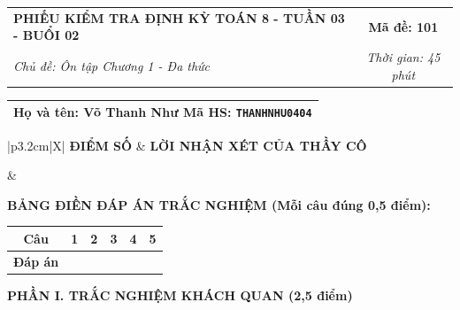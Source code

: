 \documentclass[12pt,a4paper]{article}
\begin{document}
\newpage



\noindent
\begin{tabularx}{\linewidth}{|X|c|}
\hline
\textbf{PHIẾU KIỂM TRA ĐỊNH KỲ TOÁN 8 - TUẦN 03 - BUỔI 02} & \textbf{Mã đề: 101} \\
\textit{Chủ đề: Ôn tập Chương 1 - Đa thức} & \textit{Thời gian: 45 phút} \\
\hline
\end{tabularx}

\vspace{1mm}

\noindent
\begin{tabularx}{\linewidth}{|X|}
\hline
\rule[-2mm]{0pt}{7.5mm}\textbf{Họ và tên:} \textbf{\large Võ Thanh Như} \hfill \textbf{Mã HS:} \texttt{THANHNHU0404} \quad \\
\hline
\end{tabularx}

\vspace{1mm}

\noindent
\begin{tabularx}{\linewidth}{|p{3.2cm}|X|}
\hline
\centering\textbf{ĐIỂM SỐ} & \centering\textbf{LỜI NHẬN XÉT CỦA THẦY CÔ} \tabularnewline
\hline
\rule{0pt}{1.3cm} & \tabularnewline
\hline
\end{tabularx}

\vspace{1.2mm}

\noindent\textbf{BẢNG ĐIỀN ĐÁP ÁN TRẮC NGHIỆM (Mỗi câu đúng 0,5 điểm):}
\vspace{0.8mm}

\noindent
\renewcommand{\arraystretch}{1.35}
\begin{tabularx}{\linewidth}{|c|*{5}{>{\centering\arraybackslash}X|}}
\hline
\textbf{Câu} & \textbf{1} & \textbf{2} & \textbf{3} & \textbf{4} & \textbf{5} \\
\hline
\textbf{Đáp án} & & & & & \\
\hline
\end{tabularx}
\renewcommand{\arraystretch}{1.0}

\vspace{1.5mm}

\noindent\textbf{\large PHẦN I. TRẮC NGHIỆM KHÁCH QUAN (2,5 điểm)}
\vspace{1mm}
\end{document}
